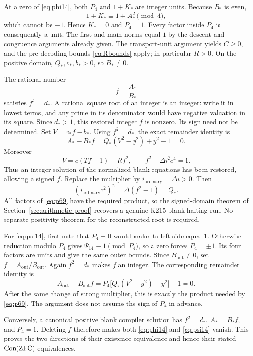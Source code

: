 At a zero of \eqref{eq:phi14}, both \(P_4\) and \(1+K_*\) are
integer units. Because \(B_*\) is even,
\[
 1+K_*\equiv1+A_*^2\pmod4,
\]
which cannot be \(-1\). Hence \(K_*=0\) and \(P_4=1\).
Every factor inside \(P_4\) is consequently a unit. The first and
main norms equal \(1\) by the descent and congruence arguments already
given. The transport-unit argument yields \(C\ge0\), and the
pre-decoding bounds \eqref{eq:Rbounds} apply; in particular \(R>0\).
On the positive domain, \(Q_*,v_*,b_*>0\), so \(B_*\ne0\).

The rational number
\[
 f=\frac{A_*}{B_*}
\]
satisfies \(f^2=d_*\). A rational square root of an integer is an
integer: write it in lowest terms, and any prime in its denominator
would have negative valuation in its square. Since \(d_*>1\),
this restored integer \(f\) is nonzero. Its sign need not be determined.
Set \(V=v_*f-b_*\). Using \(f^2=d_*\), the exact remainder identity is
\begin{equation}
 A_*-B_*f=Q_*(V^2-y^2)+y^2-1=0.
 \label{eq:root-remainder14}
\end{equation}
Moreover
\[
 V=c(Tf-1)-Rf^2,\qquad f^2-\Delta i^2c^4=1.
\]
Thus an integer solution of the normalized blank equations has been
restored, allowing a signed \(f\). Replace the multiplier by
\(i_{\mathrm{ordinary}}=\Delta i>0\). Then
\[
 (i_{\mathrm{ordinary}}c^2)^2
   =\Delta(f^2-1)=Q_*.
\]
All factors of \eqref{eq:p69} have the required product, so the
signed-domain theorem of Section~\ref{sec:arithmetic-proof} recovers
a genuine K215 blank halting run. No separate positivity theorem for
the reconstructed root is required.

For \eqref{eq:psi14}, first note that \(P_4=0\) would make its
left side equal \(1\). Otherwise reduction modulo \(P_4\) gives
\(\Psi_{14}\equiv1\pmod{P_4}\), so a zero forces
\(P_4=\pm1\). Its four factors are units and give the same
outer bounds. Since \(B_{\mathrm{out}}\ne0\), set
\(f=A_{\mathrm{out}}/B_{\mathrm{out}}\). Again \(f^2=d_*\)
makes \(f\) an integer. The corresponding remainder identity is
\[
 A_{\mathrm{out}}-B_{\mathrm{out}}f
  =P_4\bigl[Q_*(V^2-y^2)+y^2\bigr]-1=0.
\]
After the same change of strong multiplier, this is exactly the
product needed by \eqref{eq:p69}. The argument does not assume the
sign of \(P_4\) in advance.

Conversely, a canonical positive blank compiler solution has
\(f^2=d_*\), \(A_*=B_*f\), and \(P_4=1\). Deleting \(f\)
therefore makes both \eqref{eq:phi14} and \eqref{eq:psi14} vanish.
This proves the two directions of their existence equivalence and
hence their stated \(\operatorname{Con}(\mathrm{ZFC})\) equivalences.

